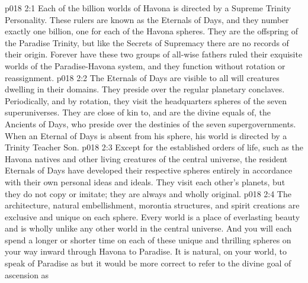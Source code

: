\vs p018 2:1 Each of the billion worlds of Havona is directed by a Supreme Trinity Personality. These rulers are known as the Eternals of Days, and they number exactly one billion, one for each of the Havona spheres. They are the offspring of the Paradise Trinity, but like the Secrets of Supremacy there are no records of their origin. Forever have these two groups of all\hyp{}wise fathers ruled their exquisite worlds of the Paradise\hyp{}Havona system, and they function without rotation or reassignment.
\vs p018 2:2 The Eternals of Days are visible to all will creatures dwelling in their domains. They preside over the regular planetary conclaves. Periodically, and by rotation, they visit the headquarters spheres of the seven superuniverses. They are close of kin to, and are the divine equals of, the Ancients of Days, who preside over the destinies of the seven supergovernments. When an Eternal of Days is absent from his sphere, his world is directed by a Trinity Teacher Son.
\vs p018 2:3 Except for the established orders of life, such as the Havona natives and other living creatures of the central universe, the resident Eternals of Days have developed their respective spheres entirely in accordance with their own personal ideas and ideals. They visit each other’s planets, but they do not copy or imitate; they are always and wholly original.
\vs p018 2:4 The architecture, natural embellishment, morontia structures, and spirit creations are exclusive and unique on each sphere. Every world is a place of everlasting beauty and is wholly unlike any other world in the central universe. And you will each spend a longer or shorter time on each of these unique and thrilling spheres on your way inward through Havona to Paradise. It is natural, on your world, to speak of Paradise as  but it would be more correct to refer to the divine goal of ascension as 
